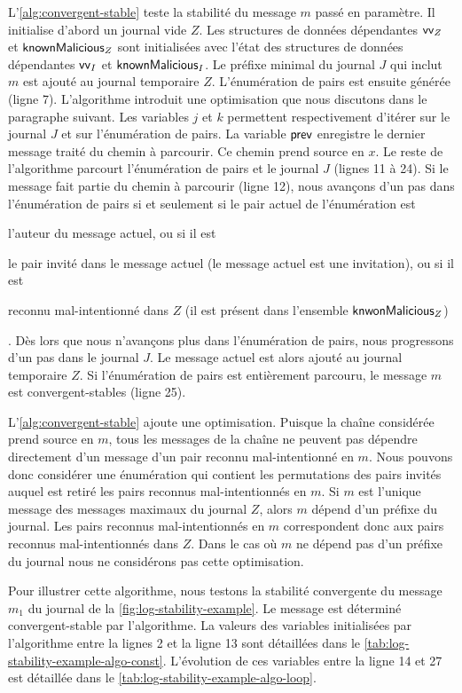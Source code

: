 L'\autoref{alg:convergent-stable} teste la stabilité du message $m$ passé en paramètre.
Il initialise d'abord un journal vide $Z$.
Les structures de données dépendantes $\operatorname{\mathsf{vv}}_Z$ et $\operatorname{\mathsf{knownMalicious}}_Z$ sont initialisées avec l'état des structures de données dépendantes $\operatorname{\mathsf{vv}}_I$ et $\operatorname{\mathsf{knownMalicious}}_I$.
Le préfixe minimal du journal $J$ qui inclut $m$ est ajouté au journal temporaire $Z$.
L'énumération de pairs est ensuite générée (ligne 7).
L'algorithme introduit une optimisation que nous discutons dans le paragraphe suivant.
Les variables $j$ et $k$ permettent respectivement d'itérer sur le journal $J$ et sur l'énumération de pairs.
La variable $\operatorname{\mathsf{prev}}$ enregistre le dernier message traité du chemin à parcourir.
Ce chemin prend source en $x$.
Le reste de l'algorithme parcourt l'énumération de pairs et le journal $J$ (lignes 11 à 24).
Si le message fait partie du chemin à parcourir (ligne 12), nous avançons d'un pas dans l'énumération de pairs si et seulement si le pair actuel de l'énumération est \begin{inlinelist}\item l'auteur du message actuel, ou si il est \item le pair invité dans le message actuel (le message actuel est une invitation), ou si il est \item reconnu mal-intentionné dans $Z$ (il est présent dans l'ensemble $\operatorname{\mathsf{knwonMalicious}}_Z$) \end{inlinelist}.
Dès lors que nous n'avançons plus dans l'énumération de pairs, nous progressons d'un pas dans le journal $J$.
Le message actuel est alors ajouté au journal temporaire $Z$.
Si l'énumération de pairs est entièrement parcouru, le message $m$ est convergent-stables (ligne 25).

L'\autoref{alg:convergent-stable} ajoute une optimisation.
Puisque la chaîne considérée prend source en $m$, tous les messages de la chaîne ne peuvent pas dépendre directement d'un message d'un pair reconnu mal-intentionné en $m$.
Nous pouvons donc considérer une énumération qui contient les permutations des pairs invités auquel est retiré les pairs reconnus mal-intentionnés en $m$.
Si $m$ est l'unique message des messages maximaux du journal $Z$, alors $m$ dépend d'un préfixe du journal.
Les pairs reconnus mal-intentionnés en $m$ correspondent donc aux pairs reconnus mal-intentionnés dans $Z$.
Dans le cas où $m$ ne dépend pas d'un préfixe du journal nous ne considérons pas cette optimisation.

Pour illustrer cette algorithme, nous testons la stabilité convergente du message $m_1$ du journal de la \autoref{fig:log-stability-example}.
Le message est déterminé convergent-stable par l'algorithme.
La valeurs des variables initialisées par l'algorithme entre la lignes 2 et la ligne 13 sont détaillées dans le \autoref{tab:log-stability-example-algo-const}.
L'évolution de ces variables entre la ligne 14 et 27 est détaillée dans le \autoref{tab:log-stability-example-algo-loop}.

